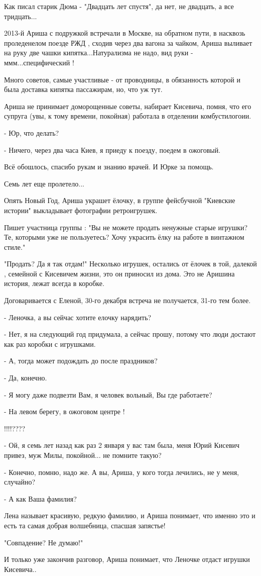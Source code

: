 
Как писал старик Дюма  - "Двадцать лет спустя", да нет, не двадцать, а все
тридцать...

2013-й Ариша с подружкой  встречали  в Москве, на обратном пути, в насквозь
проледенелом поезде РЖД , сходив через два вагона за чайком, Ариша выливает на
руку две чашки кипятка...Натурализма не надо, вид руки - ммм...специфический !

Много советов, самые участливые - от проводницы, в обязанность которой и была
доставка кипятка пассажирам, но, что уж тут.

Ариша не принимает доморощенные советы, набирает Кисевича, помня, что его
супруга (увы, к тому времени, покойная) работала в отделении комбустилогоии.

- Юр, что делать?

- Ничего, через два часа Киев, я приеду к поезду, поедем в ожоговый.

Всё обошлось, спасибо рукам и знанию врачей. И Юрке за помощь.

Семь лет еще пролетело...

Опять Новый Год, Ариша украшет ёлочку, в группе фейсбучной "Киевские истории"
выкладывает фотографии ретроигрушек.

Пишет участница группы : "Вы не можете продать ненужные старые игрушки? Те,
которыми уже не пользуетесь? Хочу украсить ёлку на работе в винтажном стиле."

"Продать? Да я так отдам!" Несколько игрушек, остались от ёлочек в той, далекой
, семейной с Кисевичем жизни,  это он приносил из дома. Это не Аришина история,
лежат всегда в коробке.

Договаривается с Еленой, 30-го декабря встреча не получается, 31-го тем более.

- Леночка, а вы сейчас хотите елочку нарядить?

- Нет, я на следующий год придумала, а сейчас прошу, потому что люди достают
как раз коробки с игрушками.

- А, тогда может подождать до после праздников?

- Да, конечно.

- Я могу даже подвезти Вам, я человек вольный, Вы где работаете?

- На левом берегу, в ожоговом центре !

!!!!????

- Ой, я семь лет назад как раз 2 января у вас там была, меня Юрий Кисевич
привез, муж Милы, покойной... не помните такую?

- Конечно, помню, надо же. А вы, Ариша, у кого тогда лечились, не у меня,
случайно?

- А как Ваша фамилия?

Лена называет красивую, редкую фамилию, и Ариша понимает, что именно это и есть
та самая добрая волшебница, спасшая запястье!

"Совпадение? Не думаю!"

И только уже закончив разговор, Ариша понимает, что Леночке отдаст игрушки
Кисевича..

